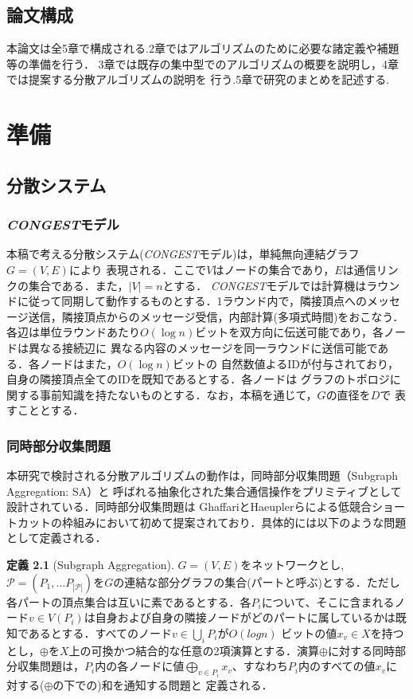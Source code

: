\documentclass{thesis}
\theoremstyle{definition}
\newtheorem{definition}{定義}
\begin{document}
\section{論文構成}
本論文は全5章で構成される.2章ではアルゴリズムのために必要な諸定義や補題等の準備を行う．
3章では既存の集中型でのアルゴリズムの概要を説明し，4章では提案する分散アルゴリズムの説明を
行う.5章で研究のまとめを記述する.

\chapter{準備}

\section{分散システム}

\subsection{\textit{CONGEST}モデル}
本稿で考える分散システム(\textit{CONGEST}モデル)は，単純無向連結グラフ$G=(V,E)$により
表現される．ここで$V$はノードの集合であり，$E$は通信リンクの集合である．また，$|V|=n$とする．
\textit{CONGEST}モデルでは計算機はラウンドに従って同期して動作するものとする．1ラウンド内で，隣接頂点へのメッセージ送信，隣接頂点からのメッセージ受信，内部計算(多項式時間)をおこなう．各辺は単位ラウンドあたり$O(\log n)$ビットを双方向に伝送可能であり，各ノードは異なる接続辺に
異なる内容のメッセージを同一ラウンドに送信可能である．各ノードはまた，$O(\log n)$ビットの
自然数値よるIDが付与されており，自身の隣接頂点全てのIDを既知であるとする．各ノードは
グラフのトポロジに関する事前知識を持たないものとする．なお，本稿を通じて，$G$の直径を$D$で
表すこととする．

\subsection{同時部分収集問題}
本研究で検討される分散アルゴリズムの動作は，同時部分収集問題（Subgraph Aggregation: SA）と
呼ばれる抽象化された集合通信操作をプリミティブとして設計されている．同時部分収集問題は
GhaffariとHaeuplerらによる低競合ショートカット\cite{ghaffari2016distributed}の枠組みにおいて初めて提案されており．具体的には以下のような問題として定義される．
\begin{definition}[Subgraph Aggregation\cite{li2018distributed}\cite{haeupler2018round}]
    $G=(V,E)$をネットワークとし,$\mathcal{P} =(P_1,...P_{|\mathcal{P}|})$を$G$の連結な部分グラフの集合(パートと呼ぶ)とする．ただし各パートの頂点集合は互いに素であるとする．各$P_i$について、そこに含まれるノード$v \in V(P_i)$は自身および自身の隣接ノードがどのパートに属しているかは既知であるとする．すべてのノード$v　\in \bigcup_i P_i$が$O(log n)$
    ビットの値$x_v \in X$を持つとし，$\oplus$を$X$上の可換かつ結合的な任意の2項演算とする．演算$\oplus$に対する同時部分収集問題は，$P_i$内の各ノードに値$\bigoplus_{v\in P_i}x_v$、すなわち$P_i$内のすべての値$x_v$に対する($\oplus$の下での)和を通知する問題と
    定義される．
\end{definition}
\end{document}
